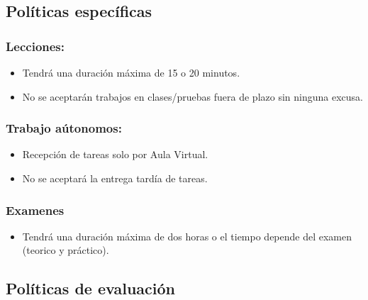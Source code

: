 \subsection{Políticas específicas}
\subsubsection{Lecciones:}
\begin{itemize}
    \item Tendrá una duración máxima de 15 o 20 minutos.
    \item No se aceptarán trabajos en clases/pruebas fuera de plazo sin ninguna excusa.
\end{itemize}
\subsubsection{Trabajo aútonomos:}
\begin{itemize}
    \item Recepción de tareas solo por Aula Virtual.
    \item No se aceptará la entrega tardía de tareas.
\end{itemize}

\subsubsection{Examenes}
\begin{itemize}
    \item Tendrá una duración máxima de dos horas o el tiempo depende del examen (teorico y práctico).
\end{itemize}

\subsection{Políticas de evaluación}

